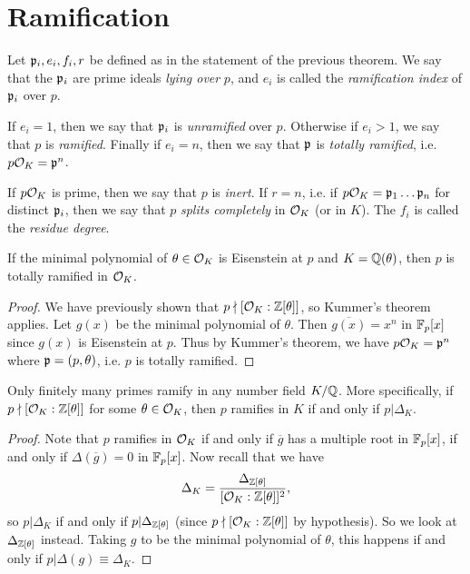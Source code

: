 \section{Ramification}

\begin{definition}
  Let $\mathfrak{p}_i, e_i, f_i, r$ be defined as in the statement
  of the previous
  theorem. We say that the $\mathfrak{p}_i$ are prime ideals
  \emph{lying over} $p$, and $e_i$ is called
  the \emph{ramification index} of $\mathfrak{p}_i$ over $p$.

  If $e_i = 1$, then we say that $\mathfrak{p}_i$ is
  \emph{unramified} over $p$. Otherwise if
  $e_i > 1$, we say that $p$ is \emph{ramified}.
  Finally if $e_i = n$, then we say that $\mathfrak{p}$ is
  \emph{totally ramified}, i.e. $p\mathcal{O}_K = \mathfrak{p}^n$.

  If $p \mathcal{O}_K$ is prime, then we say that $p$ is
  \emph{inert}. If $r = n$, i.e. if
  $p \mathcal{O}_K = \mathfrak{p}_1 \dots \mathfrak{p}_n$ for distinct $\mathfrak{p}_i$,
  then we say that $p$ \emph{splits completely} in
  $\mathcal{O}_K$ (or in $K$). The $f_i$
  is called the \emph{residue degree}.
\end{definition}

\begin{corollary}
  If the minimal polynomial of $\theta \in \mathcal{O}_K$ is
  Eisenstein at $p$ and $K = \mathbb{Q}(\theta)$, then 
  $p$ is totally ramified in $\mathcal{O}_K$.
\end{corollary}

\begin{proof}
  We have previously shown that
  $p \nmid [\mathcal{O}_K : \mathbb{Z}[\theta]]$, so Kummer's theorem
  applies. Let $g(x)$ be the minimal polynomial of
  $\theta$. Then $\overline{g(x)} = x^n$ in
  $\mathbb{F}_p[x]$ since $g(x)$ is Eisenstein at $p$. Thus
  by Kummer's theorem, we have
  $p \mathcal{O}_K = \mathfrak{p}^n$ where $\mathfrak{p} = (p, \theta)$, i.e.
  $p$ is totally ramified.
\end{proof}

\begin{corollary}
  Only finitely many primes ramify in any number
  field $K / \mathbb{Q}$. More specifically, if
  $p \nmid [\mathcal{O}_K : \mathbb{Z}[\theta]]$ for some $\theta \in \mathcal{O}_K$, then
  $p$ ramifies in $K$ if and only if
  $p | \Delta_K$.
\end{corollary}

\begin{proof}
  Note that $p$ ramifies in $\mathcal{O}_K$ if and only if
  $\overline{g}$ has a multiple root in $\mathbb{F}_p[x]$,
  if and only if $\Delta(\overline{g}) = 0$ in $\mathbb{F}_p[x]$.
  Now recall that we have
  \[
    \Delta_K = \frac{\Delta_{\mathbb{Z}[\theta]}}{[\mathcal{O}_K : \mathbb{Z}[\theta]]^2},
  \]
  so $p | \Delta_K$ if and only if
  $p | \Delta_{\mathbb{Z}[\theta]}$ (since
  $p \nmid [\mathcal{O}_K : \mathbb{Z}[\theta]]$ by hypothesis).
  So we look at $\Delta_{\mathbb{Z}[\theta]}$ instead.
  Taking $g$ to be the minimal polynomial of $\theta$,
  this happens if and only if $p | \Delta(g) \equiv \Delta_K$.
\end{proof}

